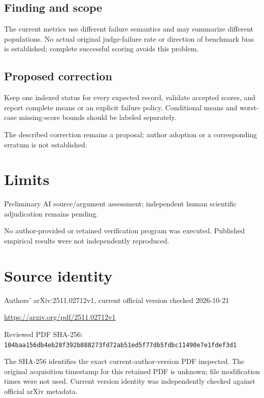 \documentclass[11pt]{article}
\begin{document}
\subsection*{Finding and scope}

The current metrics use different failure semantics and may summarize different populations. No actual original judge-failure rate or direction of benchmark bias is established; complete successful scoring avoids this problem.

\subsection*{Proposed correction}

Keep one indexed status for every expected record, validate accepted scores, and report complete means or an explicit failure policy. Conditional means and worst-case missing-score bounds should be labeled separately.

The described correction remains a proposal; author adoption or a corresponding erratum is not established.

\section*{Limits}

Preliminary AI source/argument assessment; independent human scientific adjudication remains pending.\par

No author-provided or retained verification program was executed. Published empirical results were not independently reproduced.\par

\section*{Source identity}

Authors’ arXiv:2511.02712v1, current official version checked 2026-10-21

\url{https://arxiv.org/pdf/2511.02712v1}

Reviewed PDF SHA-256: \nolinkurl{104baa156db4eb28f392b888273fd72ab51ed5f77db5fdbc11490e7e1fdef3d1}

The SHA-256 identifies the exact current-author-version PDF inspected. The original acquisition timestamp for this retained PDF is unknown; file modification times were not used. Current version identity was independently checked against official arXiv metadata.
\end{document}
